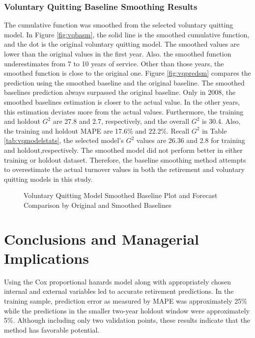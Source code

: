 \subsubsection{Voluntary Quitting Baseline Smoothing Results}
The cumulative function was smoothed from the selected voluntary quitting model. In Figure \ref{fig:vqbasm}, the solid line is the smoothed cumulative function, and the dot is the original voluntary quitting model. The smoothed values are lower than the original values in the first year. Also. the smoothed function underestimates from 7 to 10 years of service. Other than those years, the smoothed function is close to the original one. Figure \ref{fig:vqpredsm} compares the prediction using the smoothed baseline and the original baseline. The smoothed baselines prediction always surpassed the original baseline. Only in 2008, the smoothed baselines estimation is closer to the actual value.  In the other years, this estimation deviates more from the actual values. Furthermore, the training and holdout $G^2$ are 27.8 and 2.7, respectively, and the overall $G^2$ is 30.4. Also, the training and holdout MAPE are 17.6\% and 22.2\%. Recall $G^2$ in Table \ref{tab:vqmodelstats}, the selected model's $G^2$ values are 26.36 and 2.8 for training and holdout,respectively. The smoothed model did not perform better in either training or holdout dataset. Therefore, the baseline smoothing method attempts to overestimate the actual turnover values in both the retirement and voluntary quitting models in this study.
\begin{figure}[h!]
	\centering
	\caption{Voluntary Quitting Model Smoothed Baseline Plot and Forecast Comparison by Original and Smoothed Baselines}
	\label{fig:vqbaselinesm}
\end{figure}


\section{Conclusions and Managerial Implications}

Using the Cox proportional hazards model along with appropriately chosen internal and external variables led to accurate retirement predictions. In the training sample, prediction error as measured by MAPE was approximately 25\% while the predictions in the smaller two-year holdout window were approximately 5\%. Although including only two validation points, these results indicate that the method has favorable potential.

